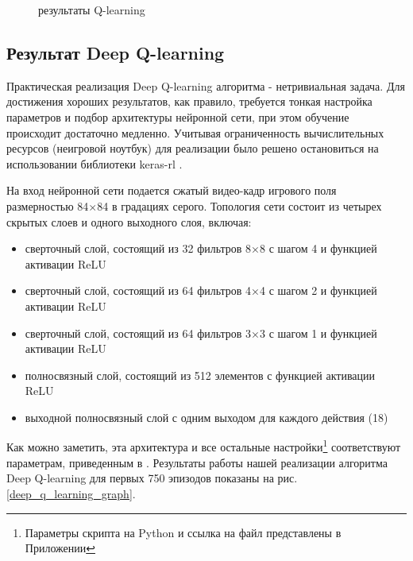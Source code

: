 \documentclass{letask}
\begin{document}
\begin{figure}[H]
\begin{center}
\begin{minipage}[h]{0.6\linewidth}
\caption{результаты Q-learning}
\label{q-learning_graph}
\end{minipage}
\end{center}
\end{figure}

\subsection{Результат Deep Q-learning}
Практическая реализация Deep Q-learning алгоритма - нетривиальная задача. Для достижения хороших результатов, как правило, требуется тонкая настройка параметров и подбор архитектуры нейронной сети, при этом обучение происходит достаточно медленно. Учитывая ограниченность вычислительных ресурсов (неигровой ноутбук) для реализации было решено остановиться на использовании библиотеки keras-rl \cite{keras-rl}. 

На вход нейронной сети подается сжатый видео-кадр игрового поля размерностью 84$\times$84 в градациях серого. Топология сети состоит из четырех скрытых слоев и одного выходного слоя, включая:
\begin{itemize}
\item сверточный слой, состоящий из 32 фильтров 8×8 с шагом 4 и функцией активации ReLU
\item сверточный слой, состоящий из 64 фильтров 4×4 с шагом 2 и функцией активации ReLU
\item сверточный слой, состоящий из 64 фильтров 3×3 с шагом 1 и функцией активации ReLU
\item полносвязный слой, состоящий из 512 элементов с функцией активации ReLU
\item выходной полносвязный слой с одним выходом для каждого действия (18)
\end{itemize}
Как можно заметить, эта архитектура и все остальные настройки\footnote{Параметры скрипта на Python и ссылка на файл представлены в Приложении} соответствуют параметрам, приведенным в \cite{Mnih}. Результаты работы нашей реализации алгоритма Deep Q-learning для первых 750 эпизодов показаны на рис. \ref{deep_q_learning_graph}. 
\end{document}
